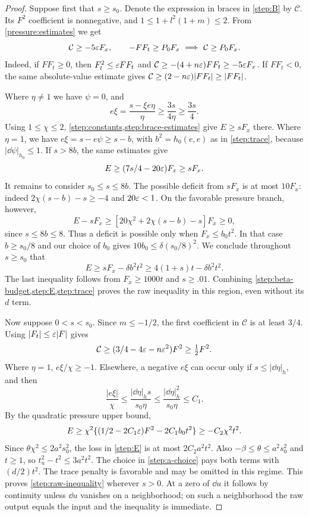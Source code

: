 \begin{proof}
Suppose first that $s\ge s_0$.  Denote the expression in braces in
\cref{step:B} by $\mathcal C$.  Its $F^2$ coefficient is nonnegative,
and $1\le1+l^2(1+m)\le2$.  From \cref{pressure:estimates} we get
\begin{equation}\label{step:brace-estimates}
 \mathcal C\ge-5\varepsilon F_x,
 \qquad
 -FF_t\ge P_0F_x\ \Longrightarrow\ \mathcal C\ge P_0F_x.
\end{equation}
Indeed, if $FF_t\ge0$, then $F_t^2\le\varepsilon FF_t$ and
$\mathcal C\ge-(4+n\varepsilon)FF_t\ge-5\varepsilon F_x$.
If $FF_t<0$, the same absolute-value estimate gives
$\mathcal C\ge(2-n\varepsilon)|FF_t|\ge|FF_t|$.

Where $\eta\ne1$ we have $\psi=0$, and
\[
 e\xi=\frac{s-\xi e\eta}{\eta}\ge\frac{3s}{4\eta}\ge\frac{3s}4.
\]
Using $1\le\chi\le2$, \cref{step:constants,step:brace-estimates}
give $E\ge sF_x$ there.  Where $\eta=1$, we have
$e\xi=s-e\psi\ge s-b$, with $b^2=h_0(e,e)$ as in \cref{step:trace},
because $|\dd\psi|_{h_0}\le1$.
If $s>8b$, the same estimates give
\[
 E\ge(7s/4-20\varepsilon)F_x\ge sF_x.
\]
It remains to consider $s_0\le s\le8b$.  The possible deficit from
$sF_x$ is at most $10F_x$: indeed
$2\chi(s-b)-s\ge-4$ and $20\varepsilon<1$.
On the favorable pressure branch, however,
\[
 E-sF_x\ge[20\chi^2+2\chi(s-b)-s]F_x\ge0,
\]
since $s\le8b\le8$.  Thus a deficit is possible only when
$F_x\le b_0t^2$.  In that case $b\ge s_0/8$ and our choice of $b_0$
gives $10b_0\le\delta(s_0/8)^2$.  We conclude throughout $s\ge s_0$
that
\begin{equation}\label{step:large-slope}
 E\ge sF_x-\delta b^2t^2
 \ge4(1+s)t-\delta b^2t^2.
\end{equation}
The last inequality follows from $F_x\ge1000t$ and $s\ge.01$.
Combining \cref{step:beta-budget,step:E,step:trace} proves the raw
inequality in this region, even without its $d$ term.

Now suppose $0<s<s_0$.  Since $m\le-1/2$, the first coefficient in
$\mathcal C$ is at least $3/4$.  Using $|F_t|\le\varepsilon|F|$ gives
\[
 \mathcal C\ge(3/4-4\varepsilon-n\varepsilon^2)F^2\ge\tfrac12F^2.
\]
Where $\eta=1$, $e\xi/\chi\ge-1$.  Elsewhere, a negative $e\xi$
can occur only if $s\le|\dd\eta|_h$, and then
\[
 \frac{|e\xi|}{\chi}
 \le\frac{|\dd\eta|_h s}{s_0\eta}
 \le\frac{|\dd\eta|_h^2}{s_0\eta}\le C_1.
\]
By the quadratic pressure upper bound,
\begin{equation}\label{step:small-slope}
 E\ge\chi^2\{(1/2-2C_1\varepsilon)F^2-2C_1b_0t^2\}
 \ge-C_2\chi^2t^2.
\end{equation}
Since $\theta\chi^2\le2a^2s_0^2$, the loss in \cref{step:E} is
at most $2C_2a^2t^2$.  Also $-\beta\le\theta\le a^2s_0^2$ and
$t\ge1$, so $t_u^2-t^2\le3a^2t^2$.  The choice in
\cref{step:a-choice} pays both terms with $(d/2)t^2$.
The trace penalty is favorable and may be omitted in this regime.
This proves \cref{step:raw-inequality} wherever $s>0$.
At a zero of $\dd u$ it follows by continuity unless $\dd u$ vanishes
on a neighborhood; on such a neighborhood the raw output equals the
input and the inequality is immediate.
\end{proof}


